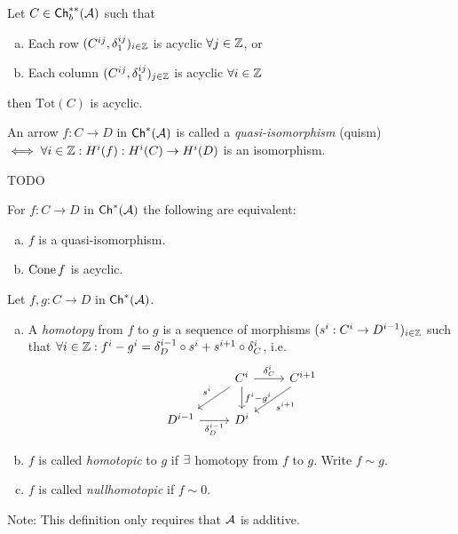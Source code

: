 \documentclass[a4paper]{report}
\begin{document}
\begin{thm}
  Let $C \in \mathsf{Ch}^{**}_{b}(\mathcal{A})$ such that
  \begin{enumerate}[(a)]
    \item Each row $(C^{ij}, \delta_{1}^{ij})_{i \in \mathbb{Z}}$ is acyclic $\forall j \in \mathbb{Z}$, or
    \item Each column $(C^{ij}, \delta_{1}^{ij})_{j \in \mathbb{Z}}$ is acyclic $\forall i \in \mathbb{Z}$
  \end{enumerate}
  then $\mathrm{Tot}(C)$ is acyclic.


\end{thm}


\begin{defi}
An arrow $f: C \to D$ in $\mathsf{Ch}^*(\mathcal{A})$ is called a \emph{quasi-isomorphism} (quism) $\iff \forall i \in \mathbb{Z}: H^{i}(f): H^{i}(C) \to H^{i}(D)$ is an isomorphism.
\end{defi}

\begin{lemm}
TODO
\end{lemm}
\begin{cor}
  For $f: C \to D$ in $\mathsf{Ch}^*(\mathcal{A})$ the following are equivalent:
  \begin{enumerate}[(a)]
    \item $f$ is a quasi-isomorphism.
          \item $\operatorname{Cone} f$ is acyclic.
  \end{enumerate}

\end{cor}

\begin{defi}
  Let $f, g : C \to D$ in $\mathsf{Ch}^*(\mathcal{A})$.
  \begin{enumerate}[(a)]
\item A \emph{homotopy} from $f$ to $g$ is a sequence of morphisms $(s^{i}: C^{i} \to D^{i-1})_{i \in \mathbb{Z}}$ such that $\forall i \in \mathbb{Z}: f^{i}-g^{i} = \delta_{D}^{i-1} \circ s^{i} + s^{i+1} \circ \delta^{i}_{C}$, i.e. \[\begin{tikzcd}
                                     & C^i \arrow[r, "\delta^i_C"] \arrow[d, "f^i-g^i"] \arrow[ld, "s^i"'] & C^{i+1} \arrow[ld, "s^{i+1}"] \\
D^{i-1} \arrow[r, "\delta^{i-1}_D"'] & D^i                                                                             &
\end{tikzcd}\]
    \item $f$ is called \emph{homotopic} to $g$ if $\exists$ homotopy from $f$ to $g$. Write $f \sim g$.
    \item $f$ is called \emph{nullhomotopic} if $f \sim 0$.
  \end{enumerate}
Note: This definition only requires that $\mathcal{A}$ is additive.
\end{defi}
\end{document}
